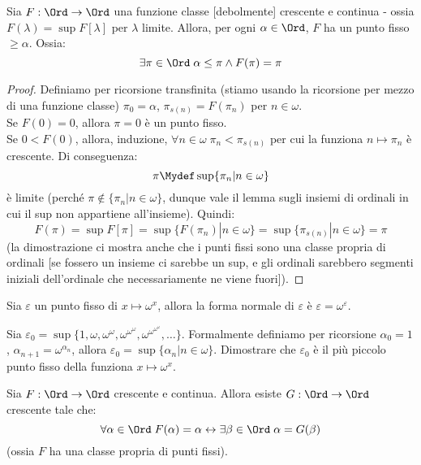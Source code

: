 \documentclass[11pt]{scrartcl}
\begin{document}
\begin{proposition}
	Sia $F : \Ord \rightarrow \Ord$ una funzione classe [debolmente] crescente e continua - ossia $F(\lambda) = \sup F[\lambda]$ per $\lambda$ limite. Allora, per ogni $\alpha \in \Ord$, $F$ ha un punto fisso $\geq \alpha$. Ossia:
	\[ \exists \pi \in \Ord \; \alpha \leq \pi \land F(\pi) = \pi
		\]
\end{proposition}

\begin{proof}
	Definiamo per ricorsione transfinita (stiamo usando la ricorsione per mezzo di una funzione classe) $\pi_0 = \alpha$, $\pi_{s(n)} = F(\pi_n)$ per $n \in \omega$.\\
	Se $F(0) = 0$, allora $\pi = 0$ è un punto fisso.\\
	Se $0 < F(0)$, allora, induzione, $\forall n \in \omega \;\pi_n < \pi_{s(n)}$ per cui la funziona $n \mapsto \pi_n$ è crescente. Di conseguenza:
	\[ \pi \Mydef \sup\{\pi_n | n \in \omega\}
		\]
	è limite (perché $\pi \not \in \{\pi_n | n \in \omega\}$, dunque vale il lemma sugli insiemi di ordinali in cui il sup non appartiene all'insieme). Quindi:
	\[ F(\pi) = \sup F[\pi] = \sup \{F(\pi_n) | n \in \omega\} = \sup\{\pi_{s(n)} | n \in \omega\} = \pi
		\]
	(la dimostrazione ci mostra anche che i punti fissi sono una classe propria di ordinali [se fossero un insieme ci sarebbe un sup, e gli ordinali sarebbero segmenti iniziali dell'ordinale che necessariamente ne viene fuori]).
\end{proof}

\begin{example}
	Sia $\varepsilon$ un punto fisso di $x \mapsto \omega^x$, allora la forma normale di $\varepsilon$ è $\varepsilon = \omega^\varepsilon$.
\end{example}

\begin{exercise}
	Sia $\varepsilon_0 = \sup\{1,\omega,\omega^{\omega},\omega^{\omega^{\omega}}, \omega^{\omega^{\omega^{\omega}}},\ldots\}$. Formalmente definiamo per ricorsione $\alpha_0 = 1$, $\alpha_{n+1}=\omega^{\alpha_n}$,
	allora $\varepsilon_0 = \sup\{\alpha_n | n \in \omega\}$. Dimostrare che $\varepsilon_0$ è il più piccolo punto fisso della funziona $x \mapsto \omega^x$.
\end{exercise}

\begin{exercise}
	Sia $F : \Ord \rightarrow \Ord$ crescente e continua. Allora esiste $G : \Ord \rightarrow \Ord$ crescente tale che:
	\[ \forall \alpha \in \Ord \; F(\alpha) = \alpha \leftrightarrow \exists \beta \in \Ord \; \alpha = G(\beta)
		\]
	(ossia $F$ ha una classe propria di punti fissi).
\end{exercise}
\end{document}
